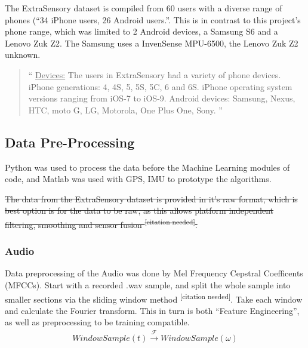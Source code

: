 \documentclass{UoNMCHA}
\newcommand{\citationneeded}{\textsuperscript{\color{blue} [citation needed]}}
\newcommand{\inlineQuote}[1]{``#1''}
\newcommand{\fancyquote}[1]{\begin{quotation}\inlineQuote{#1}\end{quotation}}
\numberwithin{equation}{section}
\begin{document}
The ExtraSensory dataset is compiled from 60 users with a diverse range of phones (\inlineQuote{34 iPhone users, 26 Android users.}\cite{Vaizman2017}. This is in contrast to this project's phone range, which was limited to 2 Android devices, a Samsung S6 and a Lenovo Zuk Z2. The Samsung uses a InvenSense MPU-6500, the Lenovo Zuk Z2 unknown.

\fancyquote{
    \underline{Devices:}
    The users in ExtraSensory had a variety of phone devices.
    iPhone generations: 4, 4S, 5, 5S, 5C, 6 and 6S.
    iPhone operating system versions ranging from iOS-7 to iOS-9.
    Android devices: Samsung, Nexus, HTC, moto G, LG, Motorola, One Plus One, Sony.
}

\subsection{Data Pre-Processing}
Python was used to process the data before the Machine Learning modules of code, and Matlab was used with GPS, IMU to prototype the algorithms. 


 \sout{The data from the ExtraSensory dataset is provided in it's raw format, which is best option is for the data to be raw, as this allows platform independent filtering, smoothing and sensor fusion\citationneeded.} 

\subsubsection{Audio}
Data preprocessing of the Audio was done by Mel Frequency Cepstral Coefficents (MFCCs). Start with a recorded .wav sample, and split the whole sample into smaller sections via the sliding window method\citationneeded. Take each window and calculate the Fourier transform. This in turn is both \inlineQuote{Feature Engineering}, as well as preprocessing to be training compatible. 
\begin{gather}%
    WindowSample(t) \xrightarrow{\mathscr{F}}  WindowSample(\omega)
\end{gather}



\end{document}
